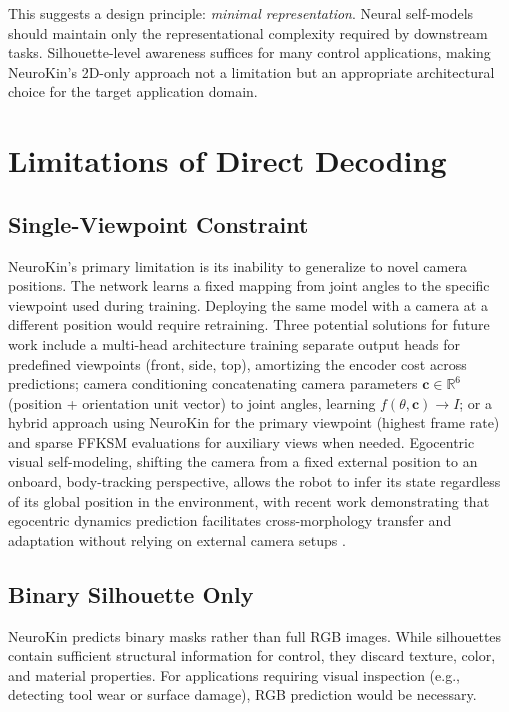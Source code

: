 \documentclass[12pt,a4paper,oneside]{report}
\begin{document}
This suggests a design principle: \textit{minimal representation}. Neural self-models should maintain only the representational complexity required by downstream tasks. Silhouette-level awareness suffices for many control applications, making NeuroKin's 2D-only approach not a limitation but an appropriate architectural choice for the target application domain.

\section{Limitations of Direct Decoding}

\subsection{Single-Viewpoint Constraint}
\label{subsec:single_viewpoint_constraint}

NeuroKin's primary limitation is its inability to generalize to novel camera positions. The network learns a fixed mapping from joint angles to the specific viewpoint used during training. Deploying the same model with a camera at a different position would require retraining. Three potential solutions for future work include a multi-head architecture training separate output heads for predefined viewpoints (front, side, top), amortizing the encoder cost across predictions; camera conditioning concatenating camera parameters $\mathbf{c} \in \mathbb{R}^6$ (position + orientation unit vector) to joint angles, learning $f(\theta, \mathbf{c}) \rightarrow I$; or a hybrid approach using NeuroKin for the primary viewpoint (highest frame rate) and sparse FFKSM evaluations for auxiliary views when needed. Egocentric visual self-modeling, shifting the camera from a fixed external position to an onboard, body-tracking perspective, allows the robot to infer its state regardless of its global position in the environment, with recent work demonstrating that egocentric dynamics prediction facilitates cross-morphology transfer and adaptation without relying on external camera setups \cite{hu2024egocentric}.

\subsection{Binary Silhouette Only}
\label{subsec:binary_silhouette_only}

NeuroKin predicts binary masks rather than full RGB images. While silhouettes contain sufficient structural information for control, they discard texture, color, and material properties. For applications requiring visual inspection (e.g., detecting tool wear or surface damage), RGB prediction would be necessary.
\end{document}
